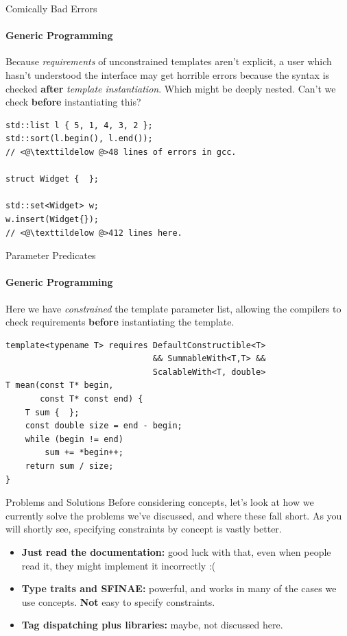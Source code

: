 \documentclass{beamer}
\begin{document}
    \begin{frame}[fragile]{Comically Bad Errors}
        \framesubtitle{Generic Programming}
        Because \emph{requirements} of unconstrained templates aren't explicit, a user which hasn't understood the interface may get horrible errors because the syntax is checked \textbf{after} \emph{template instantiation}. Which might be deeply nested. Can't we check \textbf{before} instantiating this?
        \begin{center}
            \begin{lstlisting}[caption={classic code examples that give ``bad'' template error messages.}]
std::list l { 5, 1, 4, 3, 2 };
std::sort(l.begin(), l.end());
// <@\texttildelow @>48 lines of errors in gcc.

struct Widget {  };

std::set<Widget> w;
w.insert(Widget{});
// <@\texttildelow @>412 lines here.\end{lstlisting}
        \end{center}
    \end{frame}

    \begin{frame}[fragile]{Parameter Predicates}
        \framesubtitle{Generic Programming}
        Here we have \emph{constrained} the template parameter list, allowing the compilers to check requirements \textbf{before} instantiating the template.
        \begin{center}
        \begin{lstlisting}[caption={constraining the function template using a \texttt{requires} clause.}]
template<typename T> requires DefaultConstructible<T>
                              && SummableWith<T,T> &&
                              ScalableWith<T, double>
T mean(const T* begin,
       const T* const end) {
    T sum {  };
    const double size = end - begin;
    while (begin != end)
        sum += *begin++;
    return sum / size;
} \end{lstlisting}
        \end{center}
    \end{frame}

    \begin{frame}[fragile]{Problems and Solutions}
        Before considering concepts, let's look at how we currently solve the problems we've discussed, and where these fall short. As you will shortly see, specifying constraints by concept is vastly better.
        \vspace{1em}
        \begin{itemize}
            \item{\textbf{Just read the documentation:} good luck with that, even when people read it, they might implement it incorrectly :(}
            \item{\textbf{Type traits and SFINAE:} powerful, and works in many of the cases we use concepts. \textbf{Not} easy to specify constraints.}
            \item{\textbf{Tag dispatching plus libraries:} maybe, not discussed here.}
        \end{itemize}
    \end{frame}
\end{document}
